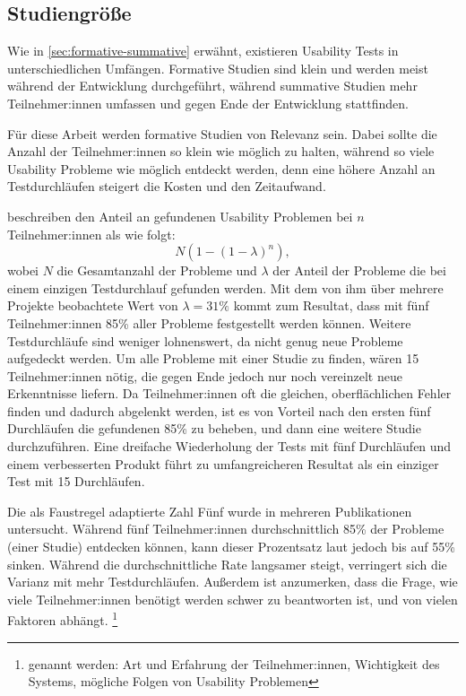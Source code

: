 \subsection{Studiengröße}
\label{sec:study-size}

Wie in \ref{sec:formative-summative} erwähnt, existieren Usability Tests in unterschiedlichen
Umfängen. Formative Studien sind klein und werden meist während der Entwicklung durchgeführt,
während summative Studien mehr Teilnehmer:innen umfassen und gegen Ende der Entwicklung stattfinden.

Für diese Arbeit werden formative Studien von Relevanz sein. Dabei sollte die Anzahl der
Teilnehmer:innen so klein wie möglich zu halten, während so viele Usability Probleme wie möglich
entdeckt werden, denn eine höhere Anzahl an Testdurchläufen steigert die Kosten und den Zeitaufwand.
\parencites{faulknerFiveuserAssumption2003, nielsenWhyYou2000}

\textcite{nielsenMathematicalModel1993} beschreiben den Anteil an gefundenen Usability Problemen bei
$n$ Teilnehmer:innen als wie folgt:
\begin{equation}
  \label{equ:finding-usability-problems}
  N(1-(1-\lambda{})^n),
\end{equation}
wobei $N$ die Gesamtanzahl der Probleme und $\lambda{}$ der Anteil der Probleme die bei einem
einzigen Testdurchlauf gefunden werden. Mit dem von ihm über mehrere Projekte beobachtete Wert von
$\lambda{}=31\%$ kommt \textcite{nielsenWhyYou2000} zum Resultat, dass mit fünf Teilnehmer:innen
85\% aller Probleme festgestellt werden können. \cite{nielsenWhyYou2000} Weitere Testdurchläufe sind
weniger lohnenswert, da nicht genug neue Probleme aufgedeckt werden. Um alle Probleme mit einer
Studie zu finden, wären 15 Teilnehmer:innen nötig, die gegen Ende jedoch nur noch vereinzelt neue
Erkenntnisse liefern. Da Teilnehmer:innen oft die gleichen, oberflächlichen Fehler finden und
dadurch abgelenkt werden, ist es von Vorteil nach den ersten fünf Durchläufen die gefundenen 85\% zu
beheben, und dann eine weitere Studie durchzuführen. Eine dreifache Wiederholung der Tests mit fünf
Durchläufen und einem verbesserten Produkt führt zu umfangreicheren Resultat als ein einziger Test
mit 15 Durchläufen.
\parencite{nielsenWhyYou2000}

Die als Faustregel adaptierte Zahl Fünf wurde in mehreren Publikationen untersucht. Während fünf
Teilnehmer:innen durchschnittlich 85\% der Probleme (einer Studie) entdecken können, kann dieser
Prozentsatz laut \textcite{faulknerFiveuserAssumption2003} jedoch bis auf 55\% sinken. Während die
durchschnittliche Rate langsamer steigt, verringert sich die Varianz mit mehr Testdurchläufen.
Außerdem ist anzumerken, dass die Frage, wie viele Teilnehmer:innen benötigt werden schwer zu
beantworten ist, und von vielen Faktoren abhängt. \footnote{genannt werden: Art und Erfahrung der
  Teilnehmer:innen, Wichtigkeit des Systems, mögliche Folgen von Usability Problemen}
\parencite{faulknerFiveuserAssumption2003}

